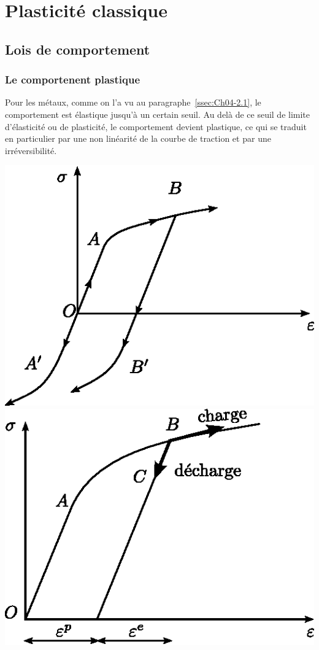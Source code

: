 \chapter{Plasticité classique} \label{chap:Ch10}
\section{Lois de comportement} \label{sec:Ch10-1}
\subsection{Le comportenent plastique} \label{ssec:Ch10-1.1}
Pour les métaux, comme on l'a vu au paragraphe~\ref{ssec:Ch04-2.1}, le comportement est élastique jusqu'à un certain seuil.
Au delà de ce seuil de limite d'élasticité ou de plasticité, le comportement devient plastique, ce qui se traduit en particulier par une non linéarité de la courbe de traction et par une irréversibilité.
\begin{center}
    \centering
    \includegraphics{../images/T1_Ch10-01.eps}
    \includegraphics{../images/T1_Ch10-02.eps}
\end{center}


